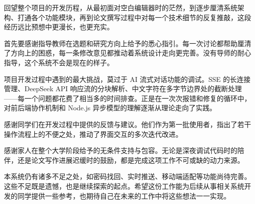 \acknowledgement

回望整个项目的开发历程，从最初面对空白编辑器时的茫然，到逐步厘清系统架构、打通各个功能模块，再到论文撰写过程中对每一个技术细节的反复推敲，这段经历远比预想中更漫长，也更充实。

首先要感谢指导教师在选题和研究方向上给予的悉心指引。每一次讨论都帮助厘清了方向上的困惑，每一条修改意见都推动着系统设计走向更完善。没有导师的耐心指导，这个系统不会是现在的样子。

项目开发过程中遇到的最大挑战，莫过于 AI 流式对话功能的调试。SSE 的长连接管理、DeepSeek API 响应流的分块解析、中文字符在多字节边界处的截断处理——每一个问题都花费了相当多的时间排查。正是在一次次报错和修复的循环中，对前后端协作机制和 Node.js 异步模型的理解逐渐从理论走向了实践。

感谢同学们在开发过程中提供的反馈与建议。他们作为第一批使用者，指出了若干操作流程上的不便之处，推动了界面交互的多次迭代改进。

感谢家人在整个大学阶段给予的无条件支持与包容。无论是深夜调试代码时的陪伴，还是论文写作进展迟缓时的鼓励，都是完成这项工作不可或缺的动力来源。

本系统仍有诸多不足之处，如密码找回、实时推送、移动端适配等功能尚待完善。这些不足既是遗憾，也是继续探索的起点。希望这份工作能为后续从事相关系统开发的同学提供一些参考，也期待自己在未来的工作中将这些想法一一实现。

